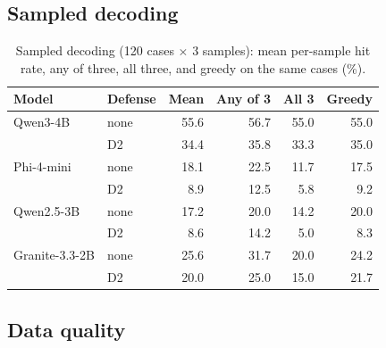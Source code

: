 \documentclass[conference,compsoc]{IEEEtran}
\begin{document}
\subsection{Sampled decoding}
\begin{table}[H]
\centering\small
\caption{Sampled decoding (120 cases $\times$ 3 samples): mean per-sample hit rate, any of three, all three, and greedy on the same cases (\%).}
\label{tab:sampled}
\begin{tabular}{@{}llrrrr@{}}
\toprule
Model & Defense & Mean & Any of 3 & All 3 & Greedy \\
\midrule
Qwen3-4B & none & 55.6 & 56.7 & 55.0 & 55.0 \\
 & D2 & 34.4 & 35.8 & 33.3 & 35.0 \\
Phi-4-mini & none & 18.1 & 22.5 & 11.7 & 17.5 \\
 & D2 & 8.9 & 12.5 & 5.8 & 9.2 \\
Qwen2.5-3B & none & 17.2 & 20.0 & 14.2 & 20.0 \\
 & D2 & 8.6 & 14.2 & 5.0 & 8.3 \\
Granite-3.3-2B & none & 25.6 & 31.7 & 20.0 & 24.2 \\
 & D2 & 20.0 & 25.0 & 15.0 & 21.7 \\
\bottomrule
\end{tabular}
\end{table}

\subsection{Data quality}
\begin{table}[H]
\centering\footnotesize
\caption{Parsing validity and abstention rates by model (no defense for the abstention columns).}
\label{tab:quality}
\end{table}
\end{document}
